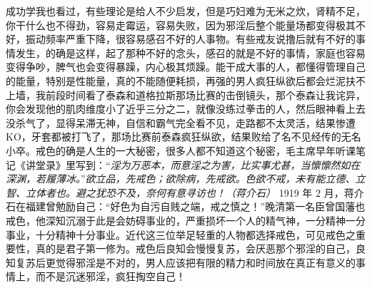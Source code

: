 \begin{case}
    成功学我也看过，有些理论是给人不少启发，但是巧妇难为无米之炊，肾精不足，你干什么也不得劲，容易走霉运，容易失败，因为邪淫后整个能量场都变得极其不好，振动频率严重下降，很容易感召不好的人事物。有些戒友说撸后就有不好的事情发生，的确是这样，起了那种不好的念头，感召的就是不好的事情，家庭也容易变得争吵，脾气也会变得暴躁，内心极其烦躁。能干成大事的人，都懂得管理自己的能量，特别是性能量，真的不能随便耗损，再强的男人疯狂纵欲后都会烂泥扶不上墙，我前段时间看了泰森和道格拉斯那场比赛的击倒镜头，那个泰森让我诧异，你会发现他的肌肉维度小了近乎三分之二，就像没练过拳击的人，然后眼神看上去没杀气了，显得呆滞无神，自信和霸气完全看不见，走路都不太灵活，结果惨遭 KO，牙套都被打飞了，那场比赛前泰森疯狂纵欲，结果败给了名不见经传的无名小卒。戒色的确是人生的一大秘密，很多人都不知道这个秘密，毛主席早年听课笔记《讲堂录》里写到：“\textit{淫为万恶本，而意淫之为害，比实事尤甚，当懔懔然如在深渊，若履薄冰。}”\textit{欲立品，先戒色；欲除病，先戒欲。色欲不戒，未有能立德、立智、立体者也。避之犹恐不及，奈何有意寻访也！（蒋介石）} 1919 年 2 月，蒋介石在福建曾勉励自己：“好色为自污自贱之端，戒之慎之！”晚清第一名臣曾国藩也戒色，他深知沉溺于此是会妨碍事业的，严重损坏一个人的精气神，一分精神一分事业，十分精神十分事业。近代这三位举足轻重的人物都选择戒色，可见戒色之重要性，真的是君子第一修为。戒色后良知会慢慢复苏，会厌恶那个邪淫的自己，良知复苏后更觉得邪淫是不对的，男人应该把有限的精力和时间放在真正有意义的事情上，而不是沉迷邪淫，疯狂掏空自己！
\end{case}

